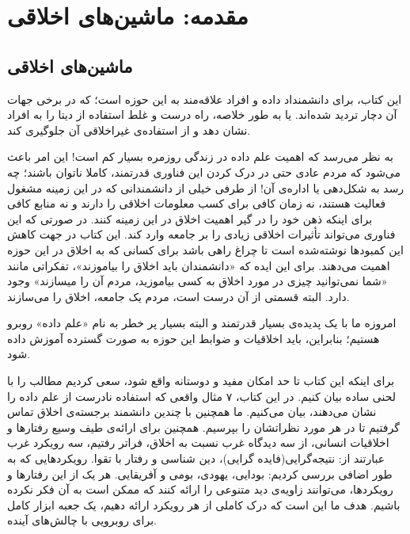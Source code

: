 \documentclass[10pt,oneside]{book}
\begin{document}
    \mainmatter


    \chapter{مقدمه: ماشین‌های اخلاقی}


    \section{ماشین‌های اخلاقی}

    این کتاب، برای دانشمنداد داده و افراد علاقه‌مند به این حوزه است؛ که در برخی جهات آن دچار تردید شده‌اند.
    یا به طور خلاصه، راه درست و غلط استفاده از دیتا را به افراد نشان دهد و از استفاده‌ی غیراخلاقی آن جلوگیری کند.

    به نظر می‌رسد که اهمیت علم داده در زندگی روزمره بسیار کم است!
    این امر باعث می‌شود که مردم عادی حتی در درک کردن این فناوری قدرتمند، کاملا ناتوان باشند؛ چه رسد به شکل‌دهی یا اداره‌ی آن!
    از طرفی خیلی از دانشمندانی که در این زمینه مشغول فعالیت هستند، نه زمان کافی برای کسب معلومات اخلاقی را دارند و نه منابع کافی برای اینکه ذهن خود را در گیر اهمیت اخلاق در این زمینه کنند.
    در صورتی که این فناوری می‌تواند تأثیرات اخلاقی زیادی را بر جامعه وارد کند.
    این کتاب در جهت کاهش این کمبودها نوشته‌شده است تا چراغ راهی باشد برای کسانی که به اخلاق در این حوزه اهمیت می‌دهند.
    برای این ایده که «دانشمندان باید اخلاق را بیاموزند»، تفکراتی مانند «شما نمی‌توانید چیزی در مورد اخلاق به کسی بیاموزید، مردم آن را میسازند» وجود دارد.
    البته قسمتی از آن درست است، مردم یک جامعه، اخلاق را می‌سازند.

    امروزه ما با یک پدیده‌ی بسیار قدرتمند و البته بسیار پر خطر به نام «علم داده» روبرو هستیم؛ بنابراین، باید اخلاقیات و ضوابط این حوزه به صورت گسترده آموزش داده شود.

    برای اینکه این کتاب تا حد امکان مفید و دوستانه واقع شود، سعی کردیم مطالب را با لحنی ساده بیان کنیم.
    در این کتاب، ۷ مثال واقعی که استفاده نادرست از علم داده را نشان می‌دهند، بیان می‌کنیم.
    ما همچنین با چندین دانشمند برجسته‌ی اخلاق تماس گرفتیم تا در هر مورد نظراتشان را بپرسیم.
    همچنین برای ارائه‌ی طیف وسیع رفتارها و اخلاقیات انسانی، از سه دیدگاه غرب نسبت به اخلاق، فراتر رفتیم، سه رویکرد غرب عبارتند از: نتیجه‌گرایی(فایده گرایی)، دین شناسی و رفتار با تقوا.
    رویکردهایی که به طور اضافی بررسی کردیم: بودایی، یهودی، بومی و آفریقایی.
    هر یک از این رفتارها و رویکردها، می‌توانند زاویه‌ی دید متنوعی را ارائه کنند که ممکن است به آن فکر نکرده باشیم.
    هدف ما این است که درک کاملی از هر رویکرد ارائه دهیم، یک جعبه ابزار کامل برای روبرویی با چالش‌های آینده.
\end{document}
